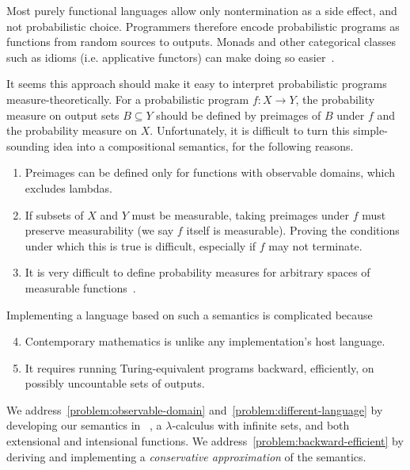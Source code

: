 Most purely functional languages allow only nontermination as a side effect, and not probabilistic choice.
Programmers therefore encode probabilistic programs as functions from random sources to outputs.
Monads and other categorical classes such as idioms (i.e. applicative functors) can make doing so easier~\cite{cit:hurd-2002thesis,cit:toronto-2010ifl-bayes}.

It seems this approach should make it easy to interpret probabilistic programs measure-theoretically.
For a probabilistic program $f : X \to Y$, the probability measure on output sets $B \subseteq Y$ should be defined by preimages of $B$ under $f$ and the probability measure on $X$.
Unfortunately, it is difficult to turn this simple-sounding idea into a compositional semantics, for the following reasons.
\begin{enumerate}
	\item Preimages can be defined only for functions with observable domains, which excludes lambdas.%
\label{problem:observable-domain}
	\item If subsets of $X$ and $Y$ must be measurable, taking preimages under $f$ must preserve measurability (we say $f$ itself is measurable). Proving the conditions under which this is true is difficult, especially if $f$ may not terminate.%
\label{problem:measurability}
	\item It is very difficult to define probability measures for arbitrary spaces of measurable functions~\cite{cit:aumann-1961ijm-borel}.%
\label{problem:higher-orderness}
\end{enumerate}
Implementing a language based on such a semantics is complicated because
\begin{enumerate}
	\setcounter{enumi}{3}
	\item Contemporary mathematics is unlike any implementation's host language.%
\label{problem:different-language}
	\item It requires running Turing-equivalent programs backward, efficiently, on possibly uncountable sets of outputs.%
\label{problem:backward-efficient}
\end{enumerate}

We address~\ref{problem:observable-domain} and~\ref{problem:different-language} by developing our semantics in \lzfclang~\cite{cit:toronto-2012flops-lzfc}, a $\lambda$-calculus with infinite sets, and both extensional and intensional functions.
We address~\ref{problem:backward-efficient} by deriving and implementing a \emph{conservative approximation} of the semantics.


